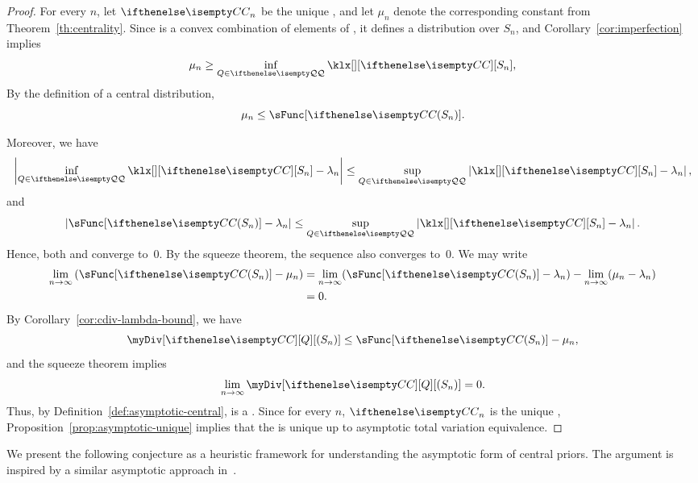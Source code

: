 \begin{proof}
    For every $n$, let $\cDist_n$ be the unique \cd[S_n], and let $\mu_n$ denote the corresponding constant
    from Theorem~\ref{th:centrality}.
    Since \cDist is a convex combination of elements of \setQ, it defines a distribution over $S_n$, and
    Corollary~\ref{cor:imperfection} implies
    \begin{equation*}
        \mu_n \geq \inf_{\inSet{Q}} \klx[][\cDist][S_n],
        \label{eq:th_lim_central_proof_inf}
    \end{equation*}
    By the definition of a central distribution,
    \begin{equation*}
        \mu_n \leq \sFunc[\cDist(S_n)].
        \label{eq:th_lim_central_proof_sup}
    \end{equation*}

    Moreover, we have
    \[
        \left|\inf_{\inSet{Q}} \klx[][\cDist][S_n] - \lambda_n \right|
        \leq \sup_{\inSet{Q}}  \left|\klx[][\cDist][S_n] - \lambda_n \right|,
    \]
    and
    \[
        \left| \sFunc[\cDist(S_n)] - \lambda_n \right|
        \leq \sup_{\inSet{Q}}  \left|\klx[][\cDist][S_n] - \lambda_n \right|.
    \]
    Hence, both 
    and  converge to~$0$.
    By the squeeze theorem, the sequence  also converges to~$0$.
    We may write
    \begin{align*}
        \toInf \left( \sFunc[\cDist(S_n)] - \mu_n \right)
        &= \toInf(\sFunc[\cDist(S_n)] - \lambda_n) - \toInf(\mu_n - \lambda_n) \\
        &= 0.
    \end{align*}
    By Corollary~\ref{cor:cdiv-lambda-bound}, we have
    \[
        \myDiv[\cDist][Q][(S_n)] \leq \sFunc[\cDist(S_n)] - \mu_n,
    \]
    and the squeeze theorem implies
    \[
        \toInf \myDiv[\cDist][Q][(S_n)] = 0.
    \]
    Thus, by Definition~\ref{def:asymptotic-central}, \cDist is a \cd[\infSeq{S}].
    Since for every $n$, $\cDist_n$ is the unique \cd[S_n], Proposition~\ref{prop:asymptotic-unique} implies that
    the \cd[\infSeq{S}] is unique up to asymptotic total variation equivalence.
\end{proof}

We present the following conjecture as a heuristic framework for understanding the asymptotic form of central
priors.
The argument is inspired by a similar asymptotic approach in~\cite{BERNARDO200517}.

